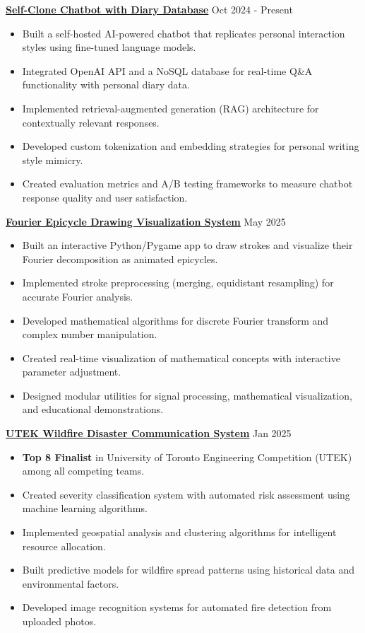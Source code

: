 \documentclass[letterpaper,10pt]{article}
\begin{document}
\vspace{0.2cm}
\noindent\href{https://chengyongkang.me/chat}{\uline{
\textbf{Self-Clone Chatbot with Diary Database}}} \hfill Oct 2024 - Present
\begin{itemize}[leftmargin=0.2in]
    \item Built a self-hosted AI-powered chatbot that replicates personal interaction styles using fine-tuned language models.
    \item Integrated OpenAI API and a NoSQL database for real-time Q\&A functionality with personal diary data.
    \item Implemented retrieval-augmented generation (RAG) architecture for contextually relevant responses.
    \item Developed custom tokenization and embedding strategies for personal writing style mimicry.
    \item Created evaluation metrics and A/B testing frameworks to measure chatbot response quality and user satisfaction.
\end{itemize}

\vspace{0.2cm}
\noindent\href{https://github.com/Ken-2511/walrus_test}{\uline{
\textbf{Fourier Epicycle Drawing Visualization System}}} \hfill May 2025
\begin{itemize}[leftmargin=0.2in]
    \item Built an interactive Python/Pygame app to draw strokes and visualize their Fourier decomposition as animated epicycles.
    \item Implemented stroke preprocessing (merging, equidistant resampling) for accurate Fourier analysis.
    \item Developed mathematical algorithms for discrete Fourier transform and complex number manipulation.
    \item Created real-time visualization of mathematical concepts with interactive parameter adjustment.
    \item Designed modular utilities for signal processing, mathematical visualization, and educational demonstrations.
\end{itemize}

\vspace{0.2cm}
\noindent\href{https://github.com/Ken-2511/utek_disaster_communication_system}{\uline{
\textbf{UTEK Wildfire Disaster Communication System}}} \hfill Jan 2025
\begin{itemize}[leftmargin=0.2in]
    \item \textbf{Top 8 Finalist} in University of Toronto Engineering Competition (UTEK) among all competing teams.
    \item Created severity classification system with automated risk assessment using machine learning algorithms.
    \item Implemented geospatial analysis and clustering algorithms for intelligent resource allocation.
    \item Built predictive models for wildfire spread patterns using historical data and environmental factors.
    \item Developed image recognition systems for automated fire detection from uploaded photos.
\end{itemize}
\end{document}
